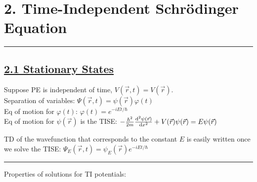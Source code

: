 \section{2. Time-Independent Schr\"{o}dinger Equation} \hrule height 0.3pt \thinspace

\subsection{\underline{2.1 Stationary States}}
Suppose PE is independent of time, $V(\vec{r}, t) = V(\vec{r})$. \\
Separation of variables: $\Psi(\vec{r}, t) = \psi(\vec{r}) \varphi(t)$ \\

Eq of motion for $\varphi(t)$: $\varphi(t) = e^{-iEt/\hbar}$ \\

Eq of motion for $\psi(\vec{r})$ is the TISE:
$-\frac{\hbar^2 }{2m} \dv[2]{\psi(\vec{r})}{x} + V(\vec{r}) \psi(\vec{r}) = E \psi(\vec{r}) $

TD of the wavefunction that corresponds to the constant $E$ is easily written once we solve the TISE: $\Psi_{E}(\vec{r}, t) = \psi_{E}(\vec{r}) e^{-iEt / \hbar}$

\hrule height 0.06pt

Properties of solutions for TI potentials:

\vspace{-10pt}

